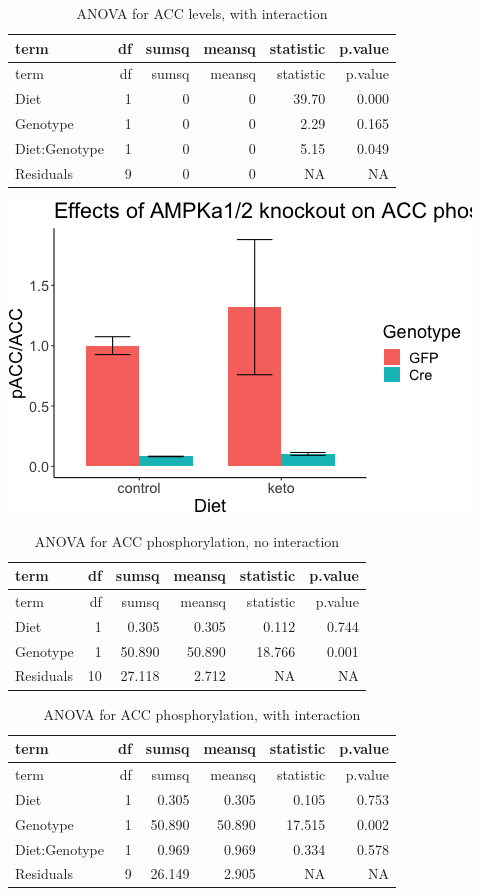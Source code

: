 \documentclass[]{article}
\begin{document}
\begin{longtable}[]{@{}lrrrrr@{}}
\caption{ANOVA for ACC levels, with interaction}\tabularnewline
\toprule
term & df & sumsq & meansq & statistic & p.value\tabularnewline
\midrule
\endfirsthead
\toprule
term & df & sumsq & meansq & statistic & p.value\tabularnewline
\midrule
\endhead
Diet & 1 & 0 & 0 & 39.70 & 0.000\tabularnewline
Genotype & 1 & 0 & 0 & 2.29 & 0.165\tabularnewline
Diet:Genotype & 1 & 0 & 0 & 5.15 & 0.049\tabularnewline
Residuals & 9 & 0 & 0 & NA & NA\tabularnewline
\bottomrule
\end{longtable}

\includegraphics{figures/pACC-barplot-1.png}

\begin{longtable}[]{@{}lrrrrr@{}}
\caption{ANOVA for ACC phosphorylation, no interaction}\tabularnewline
\toprule
term & df & sumsq & meansq & statistic & p.value\tabularnewline
\midrule
\endfirsthead
\toprule
term & df & sumsq & meansq & statistic & p.value\tabularnewline
\midrule
\endhead
Diet & 1 & 0.305 & 0.305 & 0.112 & 0.744\tabularnewline
Genotype & 1 & 50.890 & 50.890 & 18.766 & 0.001\tabularnewline
Residuals & 10 & 27.118 & 2.712 & NA & NA\tabularnewline
\bottomrule
\end{longtable}

\begin{longtable}[]{@{}lrrrrr@{}}
\caption{ANOVA for ACC phosphorylation, with interaction}\tabularnewline
\toprule
term & df & sumsq & meansq & statistic & p.value\tabularnewline
\midrule
\endfirsthead
\toprule
term & df & sumsq & meansq & statistic & p.value\tabularnewline
\midrule
\endhead
Diet & 1 & 0.305 & 0.305 & 0.105 & 0.753\tabularnewline
Genotype & 1 & 50.890 & 50.890 & 17.515 & 0.002\tabularnewline
Diet:Genotype & 1 & 0.969 & 0.969 & 0.334 & 0.578\tabularnewline
Residuals & 9 & 26.149 & 2.905 & NA & NA\tabularnewline
\bottomrule
\end{longtable}
\end{document}
